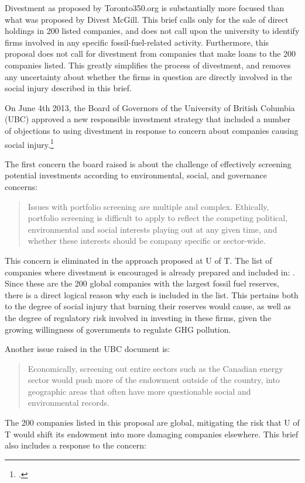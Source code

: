 \documentclass[10pt]{article}
\begin{document}
Divestment as proposed by Toronto350.org is substantially more focused than what was proposed by Divest McGill.
This brief calls only for the sale of direct holdings in 200 listed companies, and does not call upon the university to identify firms involved in any specific fossil-fuel-related activity.
Furthermore, this proposal does not call for divestment from companies that make loans to the 200 companies listed.
This greatly simplifies the process of divestment, and removes any uncertainty about whether the firms in question are directly involved in the social injury described in this brief.



On June 4th 2013, the Board of Governors of the University of British Columbia (UBC) approved a new responsible investment strategy that included a number of objections to using divestment in response to concern about companies causing social injury.\footcite[][]{UBCRespInv}



The first concern the board raised is about the challenge of effectively screening potential investments according to environmental, social, and governance concerns:
\begin{quote}
Issues with portfolio screening are multiple and complex. Ethically, portfolio screening is difficult to apply to reflect the competing political, environmental and social interests playing out at any given time, and whether these interests should be company specific or sector-wide.
\end{quote}
This concern is eliminated in the approach proposed at U of T.
The list of companies where divestment is encouraged is already prepared and included in: .
Since these are the 200 global companies with the largest fossil fuel reserves, there is a direct logical reason why each is included in the list.
This pertains both to the degree of social injury that burning their reserves would cause, as well as the degree of regulatory risk involved in investing in these firms, given the growing willingness of governments to regulate GHG pollution.



Another issue raised in the UBC document is:
\begin{quote}
Economically, screening out entire sectors such as the Canadian energy sector would push more of the endowment outside of the country, into geographic areas that often have more questionable social and environmental records.
\end{quote}
The 200 companies listed in this proposal are global, mitigating the risk that U of T would shift its endowment into more damaging companies elsewhere.
This brief also includes a response to the concern: 
\end{document}
